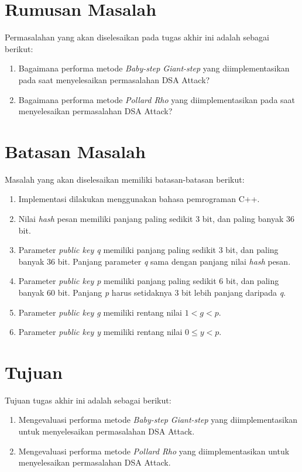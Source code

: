 \section {Rumusan Masalah}

Permasalahan yang akan diselesaikan pada tugas akhir ini adalah sebagai berikut:

\begin {enumerate}
\item Bagaimana performa metode \textit{Baby-step Giant-step} yang diimplementasikan pada saat menyelesaikan permasalahan DSA Attack?
\item Bagaimana performa metode \textit{Pollard Rho} yang diimplementasikan pada saat menyelesaikan permasalahan DSA Attack?
\end {enumerate}

\section {Batasan Masalah}

Masalah yang akan diselesaikan memiliki batasan-batasan berikut:

\begin {enumerate}
\item Implementasi dilakukan menggunakan bahasa pemrograman C++.
\item Nilai \textit{hash} pesan memiliki panjang paling sedikit 3 bit, dan paling banyak 36 bit. 
\item Parameter \textit{public key q} memiliki panjang paling sedikit 3 bit, dan paling banyak 36 bit. Panjang parameter \textit{q} sama dengan panjang nilai \textit{hash} pesan.
\item Parameter \textit{public key p} memiliki panjang paling sedikit 6 bit, dan paling banyak 60 bit. Panjang \textit{p} harus setidaknya 3 bit lebih panjang daripada \textit{q}.
\item Parameter \textit{public key g} memiliki rentang nilai $1 < g < p$.
\item Parameter \textit{public key y} memiliki rentang nilai $0 \leq y < p$.
\end {enumerate}

\section {Tujuan}

Tujuan tugas akhir ini adalah sebagai berikut:

\begin{enumerate}
\item Mengevaluasi performa metode \textit{Baby-step Giant-step} yang diimplementasikan untuk menyelesaikan permasalahan DSA Attack.
\item Mengevaluasi performa metode \textit{Pollard Rho} yang diimplementasikan untuk menyelesaikan permasalahan DSA Attack.
\end{enumerate}

